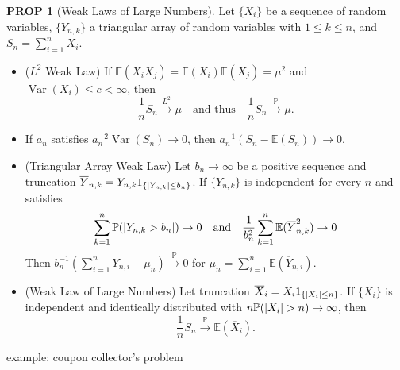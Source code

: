 \documentclass[hidelinks,11pt]{article}
\theoremstyle{definition}
\theoremstyle{dotles}
\theoremstyle{dotless}
\newtheorem{prop}{PROP}[section]
\theoremstyle{remark}
\DeclareMathOperator{\Var}{Var}
\begin{document}
\begin{prop}[Weak Laws of Large Numbers]
Let $\{X_i\}$ be a sequence of random variables, $\{Y_{n,k}\}$ a triangular array of random variables with $1\leq k\leq n$, and $S_n=\sum_{i=1}^nX_i$.
\begin{itemize}
    \item \textup{($L^2$ Weak Law)} If $\mathbb{E}(X_iX_j)=\mathbb{E}(X_i)\mathbb{E}(X_j)=\mu^2$ and $\Var(X_i)\leq c<\infty$, then
    \[\frac{1}{n}S_n\xrightarrow{L^2}\mu\quad\textrm{and thus}\quad\frac{1}{n}S_n\xrightarrow{\mathbb{P}}\mu.\]
    \item If $a_n$ satisfies $a_n^{-2}\Var(S_n)\to0$, then $a_n^{-1}(S_n-\mathbb{E}(S_n))\to0$.
    \item \textup{(Triangular Array Weak Law)} Let $b_n\to\infty$ be a positive sequence and truncation $\overline{Y}_{n,k}=Y_{n,k}1_{\{\abs{Y_{n,k}}\leq b_n\}}$. If $\{Y_{n,k}\}$ is independent for every $n$ and satisfies
    \[\sum_{k=1}^n\mathbb{P}(\abs{Y_{n,k}>b_n})\to0\quad\textrm{and}\quad\frac{1}{b_n^2}\sum_{k=1}^n\mathbb{E}(\overline{Y}_{n,k}^2)\to0\]
    Then $b_n^{-1}(\sum_{i=1}^nY_{n,i}-\overline{\mu}_n)\xrightarrow{\mathbb{P}}0$ for $\overline{\mu}_n=\sum_{i=1}^n\mathbb{E}(\overline{Y}_{n,i})$.
    \item \textup{(Weak Law of Large Numbers)} Let truncation $\overline{X}_i=X_i1_{\{\abs{X_i}\leq n\}}$. If $\{X_i\}$ is independent and identically distributed with $n\mathbb{P}(\abs{X_i}>n)\to\infty$, then
    \[\frac{1}{n}S_n\xrightarrow{\mathbb{P}}\mathbb{E}(\overline{X}_i).\]
\end{itemize}
\end{prop}

example: coupon collector's problem
\end{document}
